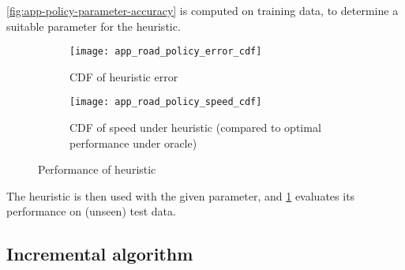 \cref{fig:app-policy-parameter-accuracy} is computed on training data, to determine a suitable parameter for the heuristic.

\begin{figure}
    \centering
    \begin{subfigure}[c]{0.45\textwidth}
      \texttt{[image: app\_road\_policy\_error\_cdf]}
      \caption{CDF of heuristic error}
    \end{subfigure}
    \begin{subfigure}[c]{0.45\textwidth}
      \texttt{[image: app\_road\_policy\_speed\_cdf]}
      \caption{CDF of speed under heuristic (compared to optimal performance under oracle)}
    \end{subfigure}
    \caption{Performance of heuristic}
    \label{fig:app-cdf}
\end{figure}

The heuristic is then used with the given parameter, and \cref{fig:app-cdf} evaluates its performance on (unseen) test data.

%
%
%
%
%

\subsection{Incremental algorithm} \label{sec:eval-incremental}

